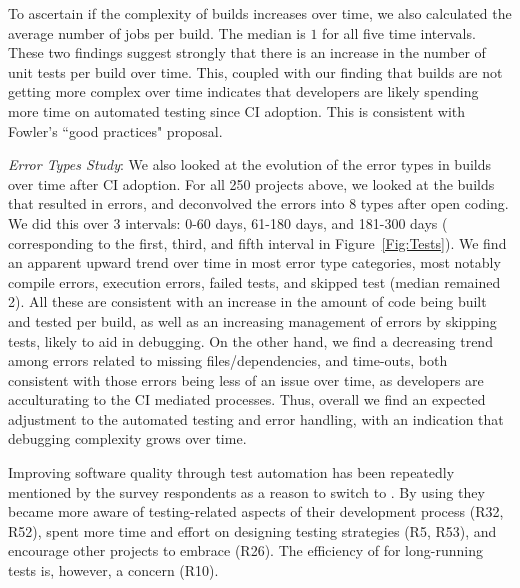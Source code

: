 To ascertain if the complexity of builds increases over time, we also calculated 
the average number of jobs per build.
The median is $1$ for all five time intervals.
These two findings suggest strongly that there is an increase in the number of 
unit tests per build over time.
This, coupled with our finding that builds are not getting more complex over time 
indicates that developers are likely spending more time on automated testing 
since CI adoption.
This is consistent with Fowler's ``good practices" proposal.

\smallskip\noindent \emph{Error Types Study}:
We also looked at the evolution of the error types in builds over time after CI 
adoption.
For all 250 projects above, we looked at the builds that resulted in errors, 
and deconvolved the errors into 8 types after open coding.
We did this over 3 intervals: 0-60 days, 61-180 days, and 181-300 days (\ie 
corresponding to the first, third, and fifth interval in Figure~\ref{Fig:Tests}).
We find an apparent upward trend over time in most error type categories, 
most notably compile errors, execution errors, failed tests, and skipped 
test (median remained 2).
All these are consistent with an increase in the amount of code being built 
and tested per build, as well as an increasing management of errors by 
skipping tests, likely to aid in debugging.
On the other hand, we find a decreasing trend among errors related to missing 
files/dependencies, and time-outs, both consistent with those errors being less 
of an issue over time, as developers are acculturating to the CI mediated 
processes.
Thus, overall we find an expected adjustment to the automated testing and 
error handling, with an indication that debugging complexity grows over time.




Improving software quality through test automation has been repeatedly mentioned 
by the survey respondents as a reason to switch to \Tvis. 
By using \Tvis they became more aware of testing-related aspects 
of their development process (R32, R52), spent more time and effort on 
designing testing strategies (R5, R53), and encourage other projects to embrace
\Tvi (R26).
The efficiency of \Tvis for long-running tests is, however, a concern (R10).

